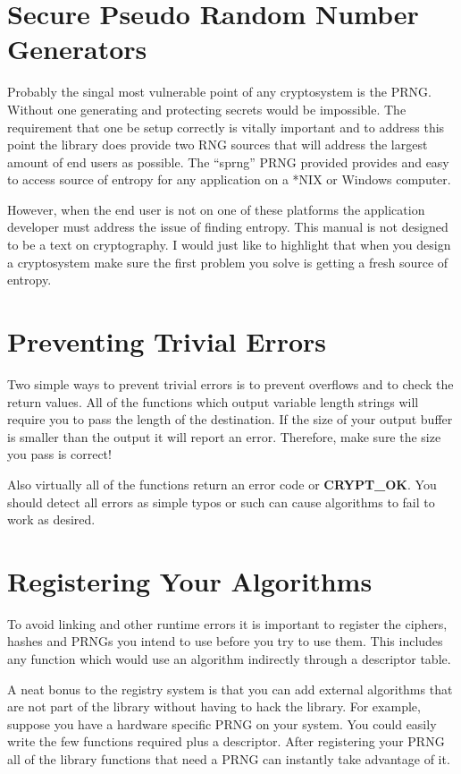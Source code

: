 \documentclass[a4paper]{book}
\begin{document}
\section{Secure Pseudo Random Number Generators}
Probably the singal most vulnerable point of any cryptosystem is the PRNG.  Without one generating and protecting secrets
would be impossible.  The requirement that one be setup correctly is vitally important and to address this point the library
does provide two RNG sources that will address the largest amount of end users as possible.  The ``sprng'' PRNG provided 
provides and easy to access source of entropy for any application on a *NIX or Windows computer.  

However, when the end user is not on one of these platforms the application developer must address the issue of finding
entropy.  This manual is not designed to be a text on cryptography.  I would just like to highlight that when you design
a cryptosystem make sure the first problem you solve is getting a fresh source of entropy.  

\section{Preventing Trivial Errors}
Two simple ways to prevent trivial errors is to prevent overflows and to check the return values.  All of the functions
which output variable length strings will require you to pass the length of the destination.  If the size of your output
buffer is smaller than the output it will report an error.  Therefore, make sure the size you pass is correct!

Also virtually all of the functions return an error code or {\bf CRYPT\_OK}.  You should detect all errors as simple 
typos or such can cause algorithms to fail to work as desired.

\section{Registering Your Algorithms}
To avoid linking and other runtime errors it is important to register the ciphers, hashes and PRNGs you intend to use 
before you try to use them.  This includes any function which would use an algorithm indirectly through a descriptor table.

A neat bonus to the registry system is that you can add external algorithms that are not part of the library without 
having to hack the library.  For example, suppose you have a hardware specific PRNG on your system.  You could easily 
write the few functions required plus a descriptor.  After registering your PRNG all of the library functions that 
need a PRNG can instantly take advantage of it.
\end{document}
